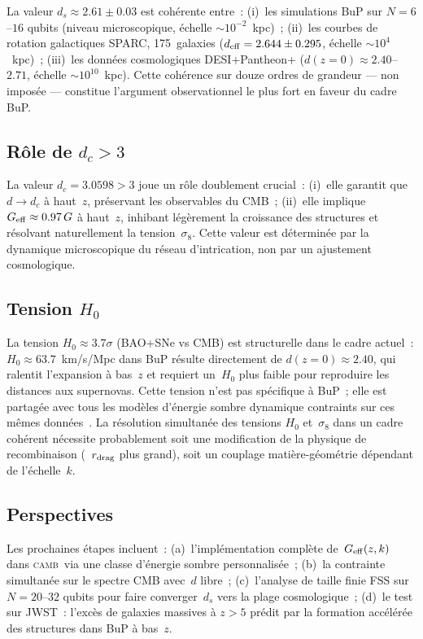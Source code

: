 \documentclass[a4paper,11pt]{article}
\newcommand{\DC}{d_c}
\newcommand{\Geff}{G_{\rm eff}}
\newcommand{\sig}{\sigma_8}
\newcommand{\camb}{\textsc{camb}}
\begin{document}
La valeur $d_s\approx 2.61\pm 0.03$ est cohérente entre~:
(i)~les simulations BuP sur $N=6$--$16$ qubits (niveau microscopique,
échelle $\sim 10^{-2}$~kpc)~;
(ii)~les courbes de rotation galactiques SPARC, 175~galaxies
($d_{\rm eff}=2.644\pm 0.295$, échelle $\sim 10^4$~kpc)~;
(iii)~les données cosmologiques DESI+Pantheon+ ($d(z=0)\approx 2.40$--$2.71$,
échelle $\sim 10^{10}$~kpc).
Cette cohérence sur douze ordres de grandeur --- non imposée ---
constitue l'argument observationnel le plus fort en faveur du cadre BuP.

\subsection{Rôle de $\DC>3$}

La valeur $\DC=3.0598>3$ joue un rôle doublement crucial~:
(i)~elle garantit que $d\to\DC$ à haut~$z$, préservant
les observables du CMB~;
(ii)~elle implique $\Geff\approx 0.97\,G$ à haut~$z$, inhibant
légèrement la croissance des structures et résolvant naturellement
la tension~$\sig$. Cette valeur est déterminée par la dynamique
microscopique du réseau d'intrication, non par un ajustement cosmologique.

\subsection{Tension $H_0$}

La tension $H_0\approx 3.7\sigma$ (BAO+SNe vs CMB) est structurelle
dans le cadre actuel~: $H_0\approx 63.7$~km/s/Mpc dans BuP résulte
directement de $d(z=0)\approx 2.40$, qui ralentit l'expansion à bas~$z$
et requiert un~$H_0$ plus faible pour reproduire les distances aux supernovas.
Cette tension n'est pas spécifique à BuP~; elle est partagée avec tous les
modèles d'énergie sombre dynamique contraints sur ces mêmes données~\cite{tensions2025}.
La résolution simultanée des tensions $H_0$ et~$\sig$ dans un cadre cohérent
nécessite probablement soit une modification de la physique de recombinaison
(~$r_{\rm drag}$ plus grand), soit un couplage matière-géométrie dépendant
de l'échelle~$k$.

\subsection{Perspectives}

Les prochaines étapes incluent~: (a)~l'implémentation complète
de~$\Geff(z,k)$ dans \camb\ via une classe d'énergie sombre
personnalisée~; (b)~la contrainte simultanée sur le spectre CMB
avec~$d$ libre~; (c)~l'analyse de taille finie FSS sur $N=20$--$32$
qubits pour faire converger~$d_s$ vers la plage cosmologique~;
(d)~le test sur JWST~: l'excès de galaxies massives à $z>5$ prédit
par la formation accélérée des structures dans BuP à bas~$z$.
\end{document}
